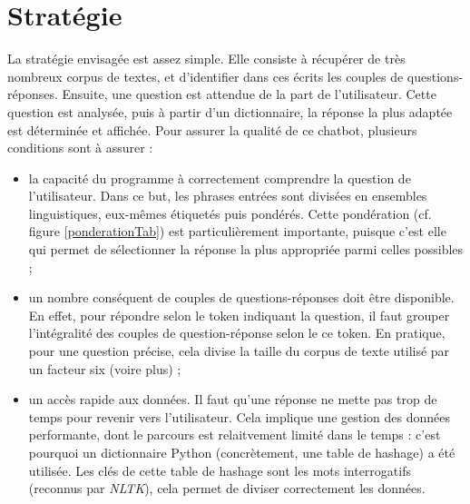 
\clearpage
\section{Stratégie}

La stratégie envisagée est assez simple. Elle consiste à récupérer de très nombreux corpus de textes, et d'identifier dans ces écrits les couples de questions-réponses. Ensuite, une question est attendue de la part de l'utilisateur. Cette question est analysée, puis à partir d'un dictionnaire, la réponse la plus adaptée est déterminée et affichée. Pour assurer la qualité de ce chatbot, plusieurs conditions sont à assurer : 
\newline
\begin{itemize}
  \item la capacité du programme à correctement comprendre la question de l'utilisateur. Dans ce but, les phrases entrées sont divisées en ensembles linguistiques, eux-mêmes étiquetés puis pondérés. Cette pondération (cf. figure \ref{ponderationTab}) est particulièrement importante, puisque c'est elle qui permet de sélectionner la réponse la plus appropriée parmi celles possibles ;
  \item un nombre conséquent de couples de questions-réponses doit être disponible. En effet, pour répondre selon le token indiquant la question, il faut grouper l'intégralité des couples de question-réponse selon le ce token. En pratique, pour une question précise, cela divise la taille du corpus de texte utilisé par un facteur six (voire plus) ;
  \item un accès rapide aux données. Il faut qu'une réponse ne mette pas trop de temps pour revenir vers l'utilisateur. Cela implique une gestion des données performante, dont le parcours est relaitvement limité dans le temps : c'est pourquoi un dictionnaire Python (concrètement, une table de hashage) a été utilisée. Les clés de cette table de hashage sont les mots interrogatifs (reconnus par \textit{NLTK}), cela permet de diviser correctement les données.
\end{itemize}

